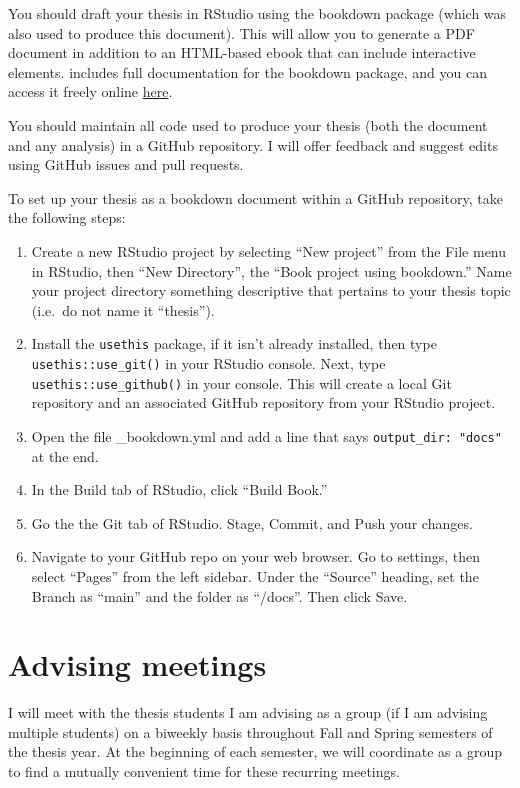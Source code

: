 \documentclass[]{tufte-book}
\providecommand{\tightlist}{%
  \setlength{\itemsep}{0pt}\setlength{\parskip}{0pt}}
\begin{document}
You should draft your thesis in RStudio using the bookdown package (which was also used to produce this document). This will allow you to generate a PDF document in addition to an HTML-based ebook that can include interactive elements. \citet{xie2016bookdown} includes full documentation for the bookdown package, and you can access it freely online \href{https://bookdown.org/yihui/bookdown/}{here}.

You should maintain all code used to produce your thesis (both the document and any analysis) in a GitHub repository. I will offer feedback and suggest edits using GitHub issues and pull requests.

To set up your thesis as a bookdown document within a GitHub repository, take the following steps:

\begin{enumerate}
\def\labelenumi{\arabic{enumi}.}
\tightlist
\item
  Create a new RStudio project by selecting ``New project'' from the File menu in RStudio, then ``New Directory'', the ``Book project using bookdown.'' Name your project directory something descriptive that pertains to your thesis topic (i.e.~do not name it ``thesis'').
\item
  Install the \texttt{usethis} package, if it isn't already installed, then type \texttt{usethis::use\_git()} in your RStudio console. Next, type \texttt{usethis::use\_github()} in your console. This will create a local Git repository and an associated GitHub repository from your RStudio project.
\item
  Open the file \_bookdown.yml and add a line that says \texttt{output\_dir:\ "docs"} at the end.
\item
  In the Build tab of RStudio, click ``Build Book.''
\item
  Go the the Git tab of RStudio. Stage, Commit, and Push your changes.
\item
  Navigate to your GitHub repo on your web browser. Go to settings, then select ``Pages'' from the left sidebar. Under the ``Source'' heading, set the Branch as ``main'' and the folder as ``/docs''. Then click Save.
\end{enumerate}

\hypertarget{advising-meetings}{%
\chapter{Advising meetings}\label{advising-meetings}}

I will meet with the thesis students I am advising as a group (if I am advising multiple students) on a biweekly basis throughout Fall and Spring semesters of the thesis year. At the beginning of each semester, we will coordinate as a group to find a mutually convenient time for these recurring meetings.
\end{document}

